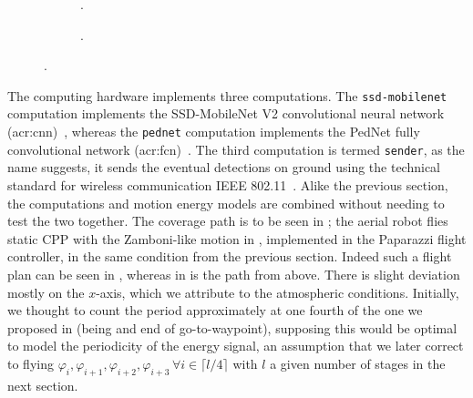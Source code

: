 \begin{figure}[h!]
  \centering
  \selectfont
  \footnotesize
  \begin{subfigure}[c]{0.475\textwidth}
    \centering
    
    \caption{.}
    \label{fig:cruise-path}
  \end{subfigure}
  \begin{subfigure}[c]{0.475\textwidth}
    \centering
    
    \vspace*{1.1ex}
    \caption{.}
    \label{fig:cruise-xy}
  \end{subfigure}
  \caption{.}
  \label{fig:cruise-prelim}
\end{figure}
The computing hardware implements three computations. The {\small\tt ssd-mobilenet} computation implements the SSD-MobileNet V2 convolutional neural network (\Gls{acr:cnn})~\citep{sandler2018mobilenetv2}, whereas the {\small\tt pednet} computation implements the PedNet fully convolutional network (\Gls{acr:fcn})~\citep{ullah2018pednet}. The third computation is termed {\small\tt sender}, as the name suggests, it sends the eventual detections on ground using the technical standard for wireless communication IEEE 802.11~\citep{crow1997ieee}. Alike the previous section, the computations and motion energy models are combined without needing to test the two together. 
The coverage path is to be seen in ; the aerial robot flies static CPP with the Zamboni-like motion in , implemented in the Paparazzi flight controller, in the same condition from the previous section. Indeed such a flight plan can be seen in , whereas in  is the path from above. There is slight deviation mostly on the $x$-axis, which we attribute to the atmospheric conditions. Initially, we thought to count the period approximately at one fourth of the one we proposed in  (being and end of go-to-waypoint), supposing this would be optimal to model the periodicity of the energy signal, an assumption that we later correct to flying $\varphi_{i},\varphi_{i+1},\varphi_{i+2},\varphi_{i+3}\,\forall i\in\lceil l/4\rceil$ with $l$ a given number of stages in the next section.

